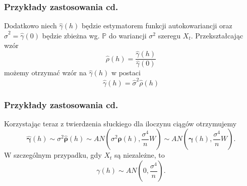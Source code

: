 \documentclass{beamer}
\begin{document}
	\begin{frame}
		\frametitle{Przykłady zastosowania cd.}
		Dodatkowo niech $\hat\gamma(h)$ będzie estymatorem funkcji autokowariancji oraz $\hat\sigma^2=\hat\gamma(0)$ będzie zbieżna wg. $\mathbb{P}$ do wariancji $\sigma^2$ szeregu $X_t$. Przekształcając wzór
		\begin{equation}
			\hat\rho(h)=\frac{\hat\gamma(h)}{\hat\gamma(0)}
		\end{equation}
		możemy otrzymać wzór na $\hat\gamma(h)$ w postaci
		\begin{equation}
			\hat\gamma(h)=\hat\sigma^2\hat\rho(h)
		\end{equation}
	\end{frame}

	\begin{frame}
		\frametitle{Przykłady zastosowania cd.}
		Korzystając teraz z twierdzenia słuckiego dla iloczynu ciągów otrzymujemy
		\begin{equation}
			\hat{\boldsymbol{\gamma}}(h)\sim \sigma^2\hat{\boldsymbol{\rho}}(h)\sim AN\left(\sigma^2\boldsymbol{\rho}(h),\frac{\sigma^4}{n}W\right)\sim AN\left(\boldsymbol\gamma(h),\frac{\sigma^4}{n}W\right).
		\end{equation}\pause
		W szczególnym przypadku, gdy $X_t$ są niezależne, to
		\begin{equation}
			\gamma(h)\sim AN\left(0,\frac{\sigma^4}{n}\right).
		\end{equation}
	\end{frame}










	
	
\end{document}
